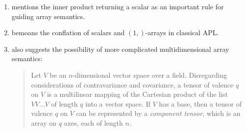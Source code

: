\begin{enumerate}
\item \cite{More1973} mentions the inner product returning a scalar as an
	important rule for guiding array semantics.

\item \cite{Haegi1976} bemoans the conflation of scalars and $(1,)$-arrays in
	classical APL.

\item \cite[p. 153]{More1973} also suggests the possibility of more complicated
	multidimensional array semantics:

\begin{quote}
Let $V$ be an $n$-dimensional vector space over a field. Disregarding
considerations of contravariance and covariance, a tensor of valence $q$ on $V$
is a multilinear mapping of the Cartesian product of the list $V V \dots V$ of
length $q$ into a vector space. If $V$ has a base, then a tensor of valence $q$
on $V$ can be represented by a \textit{component tensor}, which is an array on
$q$ axes, each of length $n$.
\end{quote}

\end{enumerate}

